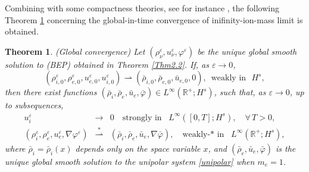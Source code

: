 \documentclass[reqno,twoside,12pt,a4paper]{amsart}
\newcommand{\R}{\mathbb{R}}
\newcommand{\eps}{\mathbb{\varepsilon}}
\newcommand{\D}{\nabla}
\newcommand{\vp}{\varphi}
\newtheorem{theorem}{Theorem}[section]
\numberwithin{equation}{section}
\begin{document}
Combining with some compactness theories, see for instance \cite{Simon1987}, the following Theorem \ref{Thm2.3} concerning the global-in-time convergence of inifinity-ion-mass limit is obtained.
\begin{theorem}\label{Thm2.3}(Global convergence) Let $(\rho_\nu^\eps, u_\nu^\eps, \vp^\eps)$ be the unique global smooth solution to (BEP) obtained in Theorem \ref{Thm2.2}. If, as $\eps\rightarrow 0$,
\begin{equation*}
(\rho_{i,0}^\eps, \rho_{e,0}^\eps, u_{e,0}^\eps, u_{i,0}^\eps)\rightharpoonup (\bar{\rho}_{i,0}, \bar{\rho}_{e,0}, \bar{u}_{e,0},0), \,\,\,\text{weakly in } \,\, H^s,
\end{equation*}
then there exist functions $(\bar{\rho}_i,\bar{\rho}_e, \bar{u}_e, \bar{\varphi})\in L^\infty(\R^+;H^s)$, such that, as $\eps\rightarrow0$, up to subsequences,
\begin{eqnarray}
u_i^\eps&\rightarrow& 0 \quad \text{strongly in } \,\,\, L^\infty([0,T];H^s), \quad \forall\,T>0,\nonumber\\
\label{con2}(\rho_i^\eps,\rho_e^\eps, u_e^\eps, \D\vp^\eps)&\stackrel{*}\rightharpoonup& (\bar{\rho}_i, \bar{\rho}_e, \bar{u}_e, \D\bar{\vp}), \quad \text{weakly-* in } \,\,\, L^\infty(\R^+;H^s),
\end{eqnarray}
where $\bar{\rho}_i=\bar{\rho}_i(x)$ depends only on the space variable $x$, and $(\bar{\rho}_e, \bar{u}_e, \bar{\vp})$ is the unique global smooth solution to the unipolar system \eqref{unipolar} when $m_e=1$.
\end{theorem}
\end{document}
